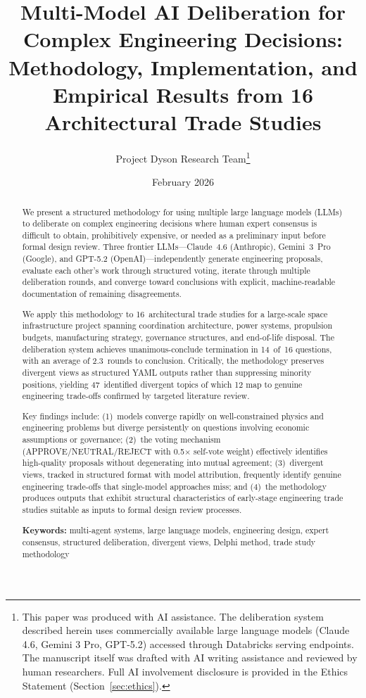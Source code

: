 \documentclass[11pt,a4paper]{article}
\title{\textbf{Multi-Model AI Deliberation for Complex Engineering Decisions: Methodology, Implementation, and Empirical Results from 16 Architectural Trade Studies}}
\author{Project Dyson Research Team\thanks{This paper was produced with AI assistance. The deliberation system described herein uses commercially available large language models (Claude 4.6, Gemini 3 Pro, GPT-5.2) accessed through Databricks serving endpoints. The manuscript itself was drafted with AI writing assistance and reviewed by human researchers. Full AI involvement disclosure is provided in the Ethics Statement (Section~\ref{sec:ethics}).}}
\affil{Project Dyson --- Open-Source Space Infrastructure Initiative\\ \texttt{https://projectdyson.org}}
\date{February 2026}
\begin{document}
\maketitle

\begin{abstract}
We present a structured methodology for using multiple large language models (LLMs) to deliberate on complex engineering decisions where human expert consensus is difficult to obtain, prohibitively expensive, or needed as a preliminary input before formal design review. Three frontier LLMs---Claude~4.6 (Anthropic), Gemini~3~Pro (Google), and GPT-5.2 (OpenAI)---independently generate engineering proposals, evaluate each other's work through structured voting, iterate through multiple deliberation rounds, and converge toward conclusions with explicit, machine-readable documentation of remaining disagreements.

We apply this methodology to 16~architectural trade studies for a large-scale space infrastructure project spanning coordination architecture, power systems, propulsion budgets, manufacturing strategy, governance structures, and end-of-life disposal. The deliberation system achieves unanimous-conclude termination in 14~of~16 questions, with an average of 2.3~rounds to conclusion. Critically, the methodology preserves divergent views as structured YAML outputs rather than suppressing minority positions, yielding 47~identified divergent topics of which 12 map to genuine engineering trade-offs confirmed by targeted literature review.

Key findings include: (1)~models converge rapidly on well-constrained physics and engineering problems but diverge persistently on questions involving economic assumptions or governance; (2)~the voting mechanism (APPROVE/NEUTRAL/REJECT with 0.5$\times$ self-vote weight) effectively identifies high-quality proposals without degenerating into mutual agreement; (3)~divergent views, tracked in structured format with model attribution, frequently identify genuine engineering trade-offs that single-model approaches miss; and (4)~the methodology produces outputs that exhibit structural characteristics of early-stage engineering trade studies suitable as inputs to formal design review processes.

\medskip
\noindent\textbf{Keywords:} multi-agent systems, large language models, engineering design, expert consensus, structured deliberation, divergent views, Delphi method, trade study methodology
\end{abstract}
\end{document}
